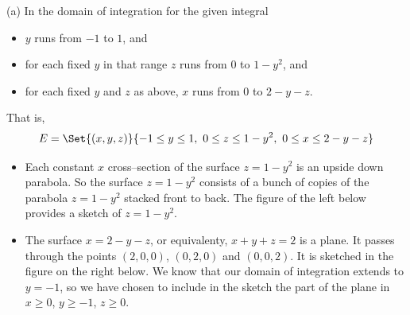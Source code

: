 \begin{solution}
(a) In the domain of integration for the given integral
\begin{itemize}
\item
$y$ runs from $-1$ to $1$, and
\item
for each fixed $y$ in that range $z$ runs from $0$ to $1-y^2$, and
\item
for each fixed $y$ and $z$ as above, $x$ runs from $0$ to $2-y-z$.
\end{itemize}
That is,
\begin{equation*}
E = \Set{(x,y,z)}{-1\le y\le 1,\ 0\le z\le 1-y^2,\ 0\le x\le 2-y-z}
\end{equation*}
\begin{itemize}
\item
Each constant $x$ cross--section of the surface $z=1-y^2$ is an upside
down parabola. So the surface $z=1-y^2$ consists of a bunch of copies of the
parabola $z=1-y^2$ stacked front to back. The figure of the left below
provides a sketch of $z=1-y^2$.

\item
The surface $x = 2-y-z$, or equivalenty, $x+y+z=2$ is a plane.
It passes through the points  $(2,0,0)$, $(0,2,0)$ and $(0,0,2)$.
It is sketched in the figure on the right below. We know that our
domain of integration extends to $y=-1$, so we have chosen to include
in the sketch the part of the plane in $x\ge 0$, $y\ge-1$, $z\ge 0$.


\end{itemize}
\end{solution}
